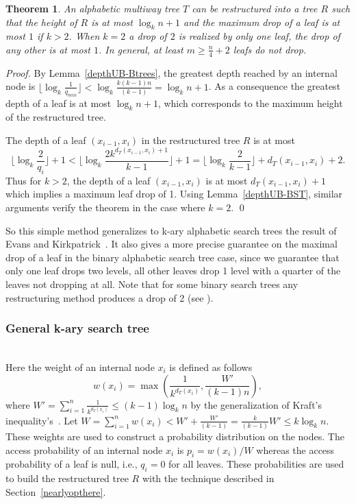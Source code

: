 \documentclass{llncs}\usepackage[english]{babel}
\newtheorem{thm}{Theorem}
\begin{document}
\begin{thm}
\label{dropdepthaddalpha}
An alphabetic multiway tree $T$ can be restructured into a tree $R$ such that the height of $R$ is at most $\log_{k} n +1$ and the maximum drop of a leaf is at most $1$ if $k> 2$. When $k=2$ a drop of $2$ is realized by only one leaf, the drop of any other is at most $1$. In general, at least $m\geq\frac{n}{4}+2$ leafs do not drop.
\end{thm}
\begin{proof}
By Lemma~\ref{depthUB-Btrees}, the greatest depth reached by an internal node is $\lfloor \log_{k} \frac{1}{q_{min}}\rfloor< \log_{k} \frac{k(k-1)n}{(k-1)} =\log_{k} n +1$. As a consequence the greatest depth of a leaf is at most $\log_{k} n +1$, which corresponds to the maximum height of the restructured tree.

The depth of a leaf $(x_{i-1},x_i)$ in the restructured tree $R$ is at most $$\lfloor \log_{k} \frac{2}{q_i}\rfloor +1< \lfloor \log_{k} \frac{2k^{d_T(x_{i-1},x_i)+1}}{k-1}\rfloor +1= \lfloor \log_{k} \frac{2}{k-1}\rfloor + d_T(x_{i-1},x_i)+2.$$ Thus for $k>2$, the depth of a leaf $(x_{i-1},x_i)$ is at most  $d_T(x_{i-1},x_i)+1$ which implies a maximum leaf drop of 1. Using Lemma~\ref{depthUB-BST}, similar arguments verify the theorem in the case where $k=2$.
\qed
\end{proof}

So this simple method generalizes to k-ary alphabetic search trees the result of Evans and Kirkpatrick~\cite{restructuringordered}. It also gives a more precise guarantee on the maximal drop of a leaf in the binary alphabetic search tree case, since we guarantee that only one leaf drops two levels, all other leaves drop 1 level with a quarter of the leaves not dropping at all. Note that for some binary search trees any restructuring method produces a drop of 2 (see \cite{restructuringordered}). 

\subsubsection{General k-ary search tree}
\label{worstdrop}
~\\
Here the weight of an internal node $x_i$ is defined as follows
$$
w(x_i)=\max \left( \frac{1}{k^{d_T(x_i)}},\frac{W'}{(k-1)n} \right),
$$
where $W'=\sum_{i=1}^{n} \frac{1}{k^{d_T(x_i)}} \leq (k-1) \log_{k} n$ by the generalization of Kraft's inequality's~\cite{lowerBoundsBST}.  Let $W=\sum_{i=1}^{n}w(x_i)< W' + \frac{W'}{(k-1)}=\frac{k}{(k-1)} W'\leq k \log_{k} n.$ These weights are used to construct a probability distribution on the nodes. The access probability of an internal node $x_i$ is $p_{i}=w(x_i)/W$ whereas the access probability of a leaf is null, i.e., $q_i=0$ for all leaves. These probabilities are used to build the restructured tree $R$ with the technique described in Section~\ref{nearlyopthere}. 
\end{document}
